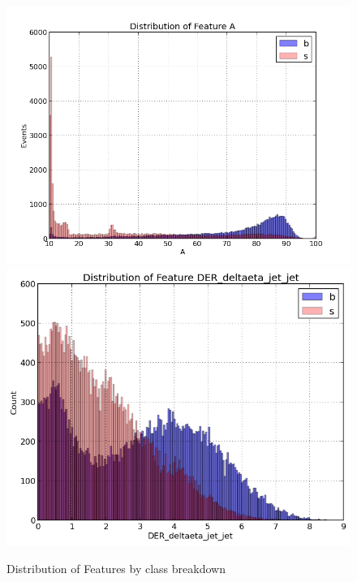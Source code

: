 \documentclass[final,3p,times,onecolumn]{elsarticle}
\begin{document}
\begin{figure}
\hspace{-0.9cm}
\includegraphics[scale=0.5]{Images/A_dist.png}
\includegraphics[scale=0.5]{Images/DER_deltaeta_jet_jet_Hist.png}
\caption{Distribution of Features by class breakdown}
\label{dists_1}
\end{figure}
\end{document}
